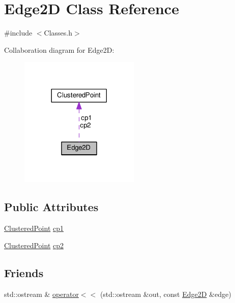 \hypertarget{class_edge2_d}{}\section{Edge2D Class Reference}
\label{class_edge2_d}


{\ttfamily \#include $<$Classes.\+h$>$}



Collaboration diagram for Edge2D\+:\nopagebreak
\begin{figure}[H]
\begin{center}
\leavevmode
\includegraphics[width=161pt]{class_edge2_d__coll__graph}
\end{center}
\end{figure}
\subsection*{Public Attributes}
\begin{DoxyCompactItemize}
\item 
\hyperlink{class_clustered_point}{Clustered\+Point} \hyperlink{class_edge2_d_acea1f08254b94f8fd4faeb8eb45d1cf9}{cp1}
\item 
\hyperlink{class_clustered_point}{Clustered\+Point} \hyperlink{class_edge2_d_a7cb403fbc28577c6a9d336d9a0bcf3a0}{cp2}
\end{DoxyCompactItemize}
\subsection*{Friends}
\begin{DoxyCompactItemize}
\item 
std\+::ostream \& \hyperlink{class_edge2_d_a2597cd903a9d51d716c988174ca269e0}{operator$<$$<$} (std\+::ostream \&out, const \hyperlink{class_edge2_d}{Edge2D} \&edge)
\end{DoxyCompactItemize}


